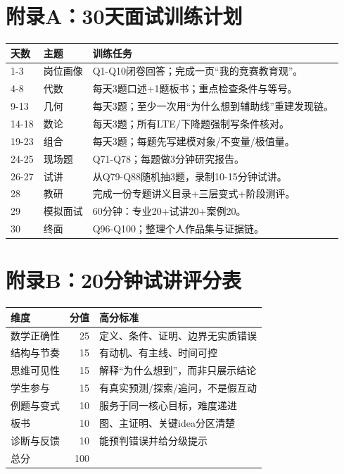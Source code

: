 \documentclass[11pt,openany]{ctexbook}
\begin{document}
\chapter{附录A：30天面试训练计划}
\begin{longtable}{p{16mm}p{31mm}p{88mm}}
\toprule
天数 & 主题 & 训练任务\\
\midrule
1-3 & 岗位画像 & Q1-Q10闭卷回答；完成一页“我的竞赛教育观”。\\
4-8 & 代数 & 每天3题口述+1题板书；重点检查条件与等号。\\
9-13 & 几何 & 每天3题；至少一次用“为什么想到辅助线”重建发现链。\\
14-18 & 数论 & 每天3题；所有LTE/下降题强制写条件核对。\\
19-23 & 组合 & 每天3题；每题先写建模对象/不变量/极值量。\\
24-25 & 现场题 & Q71-Q78；每题做3分钟研究报告。\\
26-27 & 试讲 & 从Q79-Q88随机抽3题，录制10-15分钟试讲。\\
28 & 教研 & 完成一份专题讲义目录+三层变式+阶段测评。\\
29 & 模拟面试 & 60分钟：专业20+试讲20+案例20。\\
30 & 终面 & Q96-Q100；整理个人作品集与证据链。\\
\bottomrule
\end{longtable}

\chapter{附录B：20分钟试讲评分表}
\begin{tabularx}{\textwidth}{X r X}
\toprule
维度 & 分值 & 高分标准\\
\midrule
数学正确性 & 25 & 定义、条件、证明、边界无实质错误\\
结构与节奏 & 15 & 有动机、有主线、时间可控\\
思维可见性 & 15 & 解释“为什么想到”，而非只展示结论\\
学生参与 & 15 & 有真实预测/探索/追问，不是假互动\\
例题与变式 & 10 & 服务于同一核心目标，难度递进\\
板书 & 10 & 图、主证明、关键idea分区清楚\\
诊断与反馈 & 10 & 能预判错误并给分级提示\\
\midrule
总分 & 100 & \\
\bottomrule
\end{tabularx}
\end{document}
